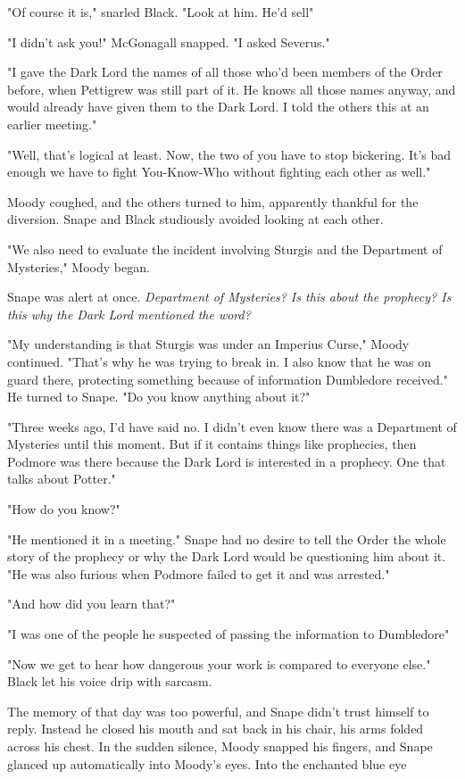"Of course it is," snarled Black. "Look at him. He'd sell{\el}"

"I didn't ask you!" McGonagall snapped. "I asked Severus."

"I gave the Dark Lord the names of all those who'd been members of the Order before, when Pettigrew was still part of it. He knows all those names anyway, and would already have given them to the Dark Lord. I told the others this at an earlier meeting."

"Well, that's logical at least. Now, the two of you have to stop bickering. It's bad enough we have to fight You-Know-Who without fighting each other as well."

Moody coughed, and the others turned to him, apparently thankful for the diversion. Snape and Black studiously avoided looking at each other.

"We also need to evaluate the incident involving Sturgis and the Department of Mysteries," Moody began.

Snape was alert at once. \emph{Department of Mysteries? Is this about the prophecy? Is this why the Dark Lord mentioned the word?}

"My understanding is that Sturgis was under an Imperius Curse," Moody continued. "That's why he was trying to break in. I also know that he was on guard there, protecting something because of information Dumbledore received." He turned to Snape. "Do you know anything about it?"

"Three weeks ago, I'd have said no. I didn't even know there was a Department of Mysteries until this moment. But if it contains things like prophecies, then Podmore was there because the Dark Lord is interested in a prophecy. One that talks about Potter."

"How do you know?"

"He mentioned it in a meeting." Snape had no desire to tell the Order the whole story of the prophecy or why the Dark Lord would be questioning him about it. "He was also furious when Podmore failed to get it and was arrested."

"And how did you learn that?"

"I was one of the people he suspected of passing the information to Dumbledore{\el}"

"Now we get to hear how dangerous your work is compared to everyone else." Black let his voice drip with sarcasm.

The memory of that day was too powerful, and Snape didn't trust himself to reply. Instead he closed his mouth and sat back in his chair, his arms folded across his chest. In the sudden silence, Moody snapped his fingers, and Snape glanced up automatically into Moody's eyes. Into the enchanted blue eye{\el}

